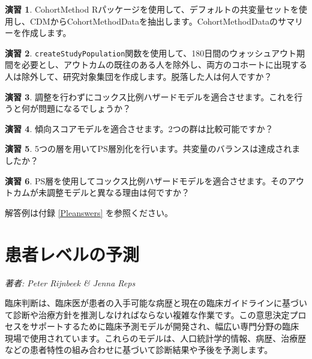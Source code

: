 \documentclass[
  11pt]{book}
\theoremstyle{definition}
\theoremstyle{definition}
\theoremstyle{definition}
\newtheorem{exercise}{演習}[chapter]
\theoremstyle{definition}
\theoremstyle{remark}
\begin{document}
\begin{exercise}
\protect\hypertarget{exr:exercisePle1}{}\label{exr:exercisePle1}CohortMethod Rパッケージを使用して、デフォルトの共変量セットを使用し、CDMからCohortMethodDataを抽出します。CohortMethodDataのサマリーを作成します。
\end{exercise}

\begin{exercise}
\protect\hypertarget{exr:exercisePle2}{}\label{exr:exercisePle2}\texttt{createStudyPopulation}関数を使用して、180日間のウォッシュアウト期間を必要とし、アウトカムの既往のある人を除外し、両方のコホートに出現する人は除外して、研究対象集団を作成します。脱落した人は何人ですか？
\end{exercise}

\begin{exercise}
\protect\hypertarget{exr:exercisePle3}{}\label{exr:exercisePle3}調整を行わずにコックス比例ハザードモデルを適合させます。これを行うと何が問題になるでしょうか？
\end{exercise}

\begin{exercise}
\protect\hypertarget{exr:exercisePle4}{}\label{exr:exercisePle4}傾向スコアモデルを適合させます。2つの群は比較可能ですか？
\end{exercise}

\begin{exercise}
\protect\hypertarget{exr:exercisePle5}{}\label{exr:exercisePle5}5つの層を用いてPS層別化を行います。共変量のバランスは達成されましたか？
\end{exercise}

\begin{exercise}
\protect\hypertarget{exr:exercisePle6}{}\label{exr:exercisePle6}PS層を使用してコックス比例ハザードモデルを適合させます。そのアウトカムが未調整モデルと異なる理由は何ですか？
\end{exercise}

解答例は付録 \ref{Pleanswers} を参照ください。

\chapter{患者レベルの予測}\label{PatientLevelPrediction}

\emph{著者: Peter Rijnbeek \& Jenna Reps}


臨床判断は、臨床医が患者の入手可能な病歴と現在の臨床ガイドラインに基づいて診断や治療方針を推測しなければならない複雑な作業です。この意思決定プロセスをサポートするために臨床予測モデルが開発され、幅広い専門分野の臨床現場で使用されています。これらのモデルは、人口統計学的情報、病歴、治療歴などの患者特性の組み合わせに基づいて診断結果や予後を予測します。   
\end{document}
